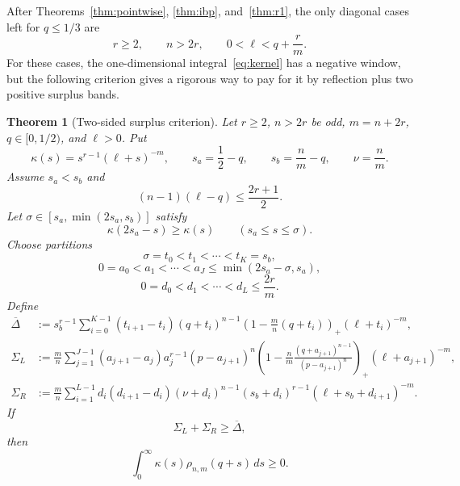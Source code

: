 \documentclass[11pt]{article}
\newtheorem{theorem}{Theorem}[section]
\begin{document}
After Theorems~\ref{thm:pointwise}, \ref{thm:ibp}, and~\ref{thm:r1}, the only diagonal cases left for $q\le1/3$ are
\begin{equation}\label{eq:residual-strip}
        r\ge2,
        \qquad n>2r,
        \qquad 0<\ell<q+\frac rm.
\end{equation}
For these cases, the one-dimensional integral~\eqref{eq:kernel} has a negative window, but the following criterion gives a rigorous way to pay for it by reflection plus two positive surplus bands.

\begin{theorem}[Two-sided surplus criterion]\label{thm:strip}
Let $r\ge2$, $n>2r$ be odd, $m=n+2r$, $q\in[0,1/2)$, and $\ell>0$.  Put
\[
        \kappa(s)=s^{r-1}(\ell+s)^{-m},
        \qquad
        s_a=\frac12-q,
        \qquad
        s_b=\frac nm-q,
        \qquad
        \nu=\frac nm.
\]
Assume $s_a<s_b$ and
\begin{equation}\label{eq:mono-cond}
        (n-1)(\ell-q)\le\frac{2r+1}{2}.
\end{equation}
Let $\sigma\in[s_a,\min(2s_a,s_b)]$ satisfy
\begin{equation}\label{eq:Z-clean}
        \kappa(2s_a-s)\ge\kappa(s)
        \qquad(s_a\le s\le\sigma).
\end{equation}
Choose partitions
\[
        \sigma=t_0<t_1<\cdots<t_K=s_b,
\]
\[
        0=a_0<a_1<\cdots<a_J\le\min(2s_a-\sigma,s_a),
\]
\[
        0=d_0<d_1<\cdots<d_L\le\frac{2r}{m}.
\]
Define
\begin{align*}
        \overline\Delta
        &:=s_b^{r-1}\sum_{i=0}^{K-1}(t_{i+1}-t_i)
        (q+t_i)^{n-1}\left(1-\frac mn(q+t_i)\right)_+
        (\ell+t_i)^{-m},\\
        \Sigma_L
        &:=\frac mn\sum_{j=1}^{J-1}(a_{j+1}-a_j)a_j^{r-1}
        (p-a_{j+1})^n
        \left(1-\frac nm\frac{(q+a_{j+1})^{n-1}}{(p-a_{j+1})^n}\right)_+
        (\ell+a_{j+1})^{-m},\\
        \Sigma_R
        &:=\frac mn\sum_{i=1}^{L-1}d_i(d_{i+1}-d_i)
        (\nu+d_i)^{n-1}(s_b+d_i)^{r-1}
        (\ell+s_b+d_{i+1})^{-m}.
\end{align*}
If
\[
        \Sigma_L+\Sigma_R\ge\overline\Delta,
\]
then
\[
        \int_0^\infty \kappa(s)\rho_{n,m}(q+s)\,ds\ge0.
\]
\end{theorem}
\end{document}
